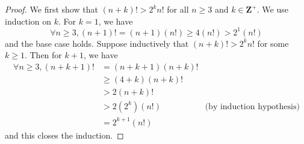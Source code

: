 \begin{proof}
    We first show that \((n + k)! > 2^k n!\) for all \(n \geq 3\) and \(k \in \mathbf{Z}^+\).
    We use induction on \(k\).
    For \(k = 1\), we have
    \[
        \forall n \geq 3, (n + 1)! = (n + 1) (n!) \geq 4 (n!) > 2^1 (n!)
    \]
    and the base case holds.
    Suppose inductively that \((n + k)! > 2^k n!\) for some \(k \geq 1\).
    Then for \(k + 1\), we have
    \begin{align*}
        \forall n \geq 3, (n + k + 1)! & = (n + k + 1) (n + k)!                                    \\
                                       & \geq (4 + k)(n + k)!                                      \\
                                       & > 2 (n + k)!                                              \\
                                       & > 2 (2^k) (n!)         & \text{(by induction hypothesis)} \\
                                       & = 2^{k + 1} (n!)
    \end{align*}
    and this closes the induction.


\end{proof}
